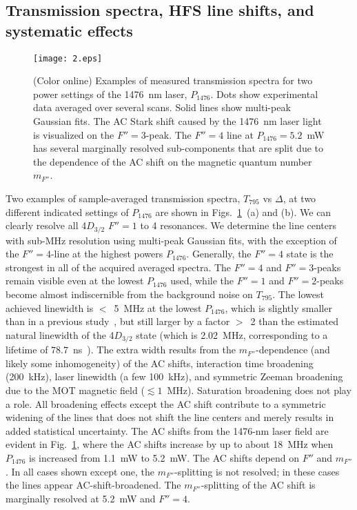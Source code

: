\documentclass[reprint, amsmath,amssymb, aps, pra, longbibliography]{revtex4-1}
\begin{document}
\subsection{Transmission spectra, HFS line shifts, and systematic effects}
\label{subsec:hfsresult}

\begin{figure}[t!]
 \centering
  \texttt{[image: 2.eps]}
  \caption{(Color online) Examples of measured transmission spectra for two power settings of the 1476~nm laser, $P_{1476}$. Dots show experimental data averaged over several scans. Solid lines show multi-peak Gaussian fits. The AC Stark shift 
  caused by the 1476~nm laser light is visualized on the $F''=3$-peak.
  The $F''=4$ line at $P_{1476}=5.2$~mW has several marginally resolved sub-components that are split due to the dependence of the AC shift on the magnetic quantum number $m_{F''}$.} 
  \label{fig2}
\end{figure}

Two examples of sample-averaged transmission spectra, $T_{795}$ vs $\Delta$, at two different indicated settings of $P_{1476}$ are shown in Figs.~\ref{fig2}~(a) and (b). We can clearly resolve all 4$D_{3/2}$ $F''=1$ to 4 resonances. We determine the line centers with sub-MHz resolution using multi-peak Gaussian fits, with the exception of the $F''=4$-line at the highest
powers $P_{1476}$. Generally, the $F'' = 4$ state is the strongest in all of the acquired averaged spectra. The $F''=4$ and $F''=3$-peaks remain visible even at the lowest $P_{1476}$ used, while the $F'' = 1$ and $F''=2$-peaks become almost indiscernible from the background noise on $T_{795}$. The lowest achieved linewidth is $<$~5~MHz at the lowest $P_{1476}$, which is slightly smaller than in a previous study~\cite{moon2009}, but still larger by a factor $>$~2 than the estimated natural linewidth of the 4$D_{3/2}$ state (which is 2.02~MHz, corresponding to a lifetime of $78.7$~ns~\cite{Heavens_61}). The 
extra width results from the $m_{F''}$-dependence (and likely some inhomogeneity) of the AC shifts, interaction time broadening (200~kHz), laser linewidth (a few 100~kHz), and symmetric Zeeman broadening due to the MOT magnetic field ($\lesssim 1$~MHz). 
Saturation broadening does not play a role.
All broadening effects except the AC shift contribute to a symmetric widening of the lines that does not shift the line centers and merely results in added statistical uncertainty. The AC shifts from the 1476-nm laser field are evident in Fig.~\ref{fig2}, where the AC shifts increase by up to about 18~MHz when $P_{1476}$ is increased from 1.1~mW to 5.2~mW. The AC shifts depend on $F''$ and $m_{F''}$. In all cases shown except one, the
$m_{F''}$-splitting is not resolved; in these cases the lines appear AC-shift-broadened. The $m_{F''}$-splitting of the AC shift is marginally resolved at 5.2~mW and $F''=4$.
\end{document}
